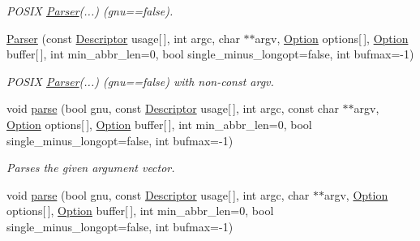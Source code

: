 \begin{DoxyCompactItemize}
\begin{DoxyCompactList}\small\item\em \-P\-O\-S\-I\-X \hyperlink{classoption_1_1_parser}{\-Parser}(...) (gnu==false). \end{DoxyCompactList}\item 
\hypertarget{classoption_1_1_parser_a23ee244634a38d05f6c4cb1e3692a8a9}{\hyperlink{classoption_1_1_parser_a23ee244634a38d05f6c4cb1e3692a8a9}{\-Parser} (const \hyperlink{structoption_1_1_descriptor}{\-Descriptor} usage\mbox{[}$\,$\mbox{]}, int argc, char $\ast$$\ast$argv, \hyperlink{classoption_1_1_option}{\-Option} options\mbox{[}$\,$\mbox{]}, \hyperlink{classoption_1_1_option}{\-Option} buffer\mbox{[}$\,$\mbox{]}, int min\-\_\-abbr\-\_\-len=0, bool single\-\_\-minus\-\_\-longopt=false, int bufmax=-\/1)}\label{classoption_1_1_parser_a23ee244634a38d05f6c4cb1e3692a8a9}

\begin{DoxyCompactList}\small\item\em \-P\-O\-S\-I\-X \hyperlink{classoption_1_1_parser}{\-Parser}(...) (gnu==false) with non-\/const argv. \end{DoxyCompactList}\item 
void \hyperlink{classoption_1_1_parser_a6e0b5778d1cfbd6cd51240e74d01e138}{parse} (bool gnu, const \hyperlink{structoption_1_1_descriptor}{\-Descriptor} usage\mbox{[}$\,$\mbox{]}, int argc, const char $\ast$$\ast$argv, \hyperlink{classoption_1_1_option}{\-Option} options\mbox{[}$\,$\mbox{]}, \hyperlink{classoption_1_1_option}{\-Option} buffer\mbox{[}$\,$\mbox{]}, int min\-\_\-abbr\-\_\-len=0, bool single\-\_\-minus\-\_\-longopt=false, int bufmax=-\/1)
\begin{DoxyCompactList}\small\item\em \-Parses the given argument vector. \end{DoxyCompactList}\item 
\hypertarget{classoption_1_1_parser_ab26280e3b2ebc2f2fc4ed8b3b1e2a39c}{void \hyperlink{classoption_1_1_parser_ab26280e3b2ebc2f2fc4ed8b3b1e2a39c}{parse} (bool gnu, const \hyperlink{structoption_1_1_descriptor}{\-Descriptor} usage\mbox{[}$\,$\mbox{]}, int argc, char $\ast$$\ast$argv, \hyperlink{classoption_1_1_option}{\-Option} options\mbox{[}$\,$\mbox{]}, \hyperlink{classoption_1_1_option}{\-Option} buffer\mbox{[}$\,$\mbox{]}, int min\-\_\-abbr\-\_\-len=0, bool single\-\_\-minus\-\_\-longopt=false, int bufmax=-\/1)}\label{classoption_1_1_parser_ab26280e3b2ebc2f2fc4ed8b3b1e2a39c}


\end{DoxyCompactItemize}
